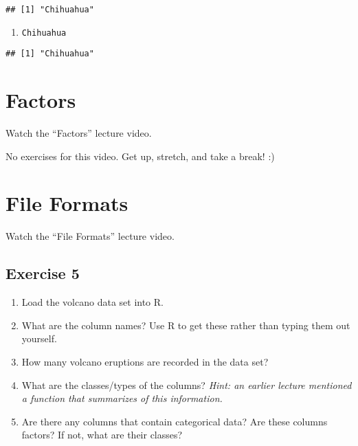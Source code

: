 \documentclass[
]{article}
\newenvironment{Shaded}{\begin{snugshade}}{\end{snugshade}}
\newcommand{\DecValTok}[1]{\textcolor[rgb]{0.00,0.00,0.81}{#1}}
\newcommand{\KeywordTok}[1]{\textcolor[rgb]{0.13,0.29,0.53}{\textbf{#1}}}
\newcommand{\NormalTok}[1]{#1}
\newcommand{\OperatorTok}[1]{\textcolor[rgb]{0.81,0.36,0.00}{\textbf{#1}}}
\providecommand{\tightlist}{%
  \setlength{\itemsep}{0pt}\setlength{\parskip}{0pt}}
\begin{document}
\begin{verbatim}
## [1] "Chihuahua"
\end{verbatim}

\begin{enumerate}
\def\labelenumi{\arabic{enumi}.}
\setcounter{enumi}{3}
\tightlist
\item
  \texttt{Chihuahua}
\end{enumerate}

\begin{Shaded}
\end{Shaded}

\begin{verbatim}
## [1] "Chihuahua"
\end{verbatim}

\hypertarget{factors}{%
\section{Factors}\label{factors}}

Watch the ``Factors'' lecture video.

No exercises for this video. Get up, stretch, and take a break! :)

\hypertarget{file-formats}{%
\section{File Formats}\label{file-formats}}

Watch the ``File Formats'' lecture video.

\hypertarget{exercise-5}{%
\subsection{Exercise 5}\label{exercise-5}}

\begin{enumerate}
\def\labelenumi{\arabic{enumi}.}
\tightlist
\item
  Load the volcano data set into R.
\item
  What are the column names? Use R to get these rather than typing them
  out yourself.
\item
  How many volcano eruptions are recorded in the data set?
\item
  What are the classes/types of the columns? \emph{Hint: an earlier
  lecture mentioned a function that summarizes of this information.}
\item
  Are there any columns that contain categorical data? Are these columns
  factors? If not, what are their classes?
\end{enumerate}
\end{document}
